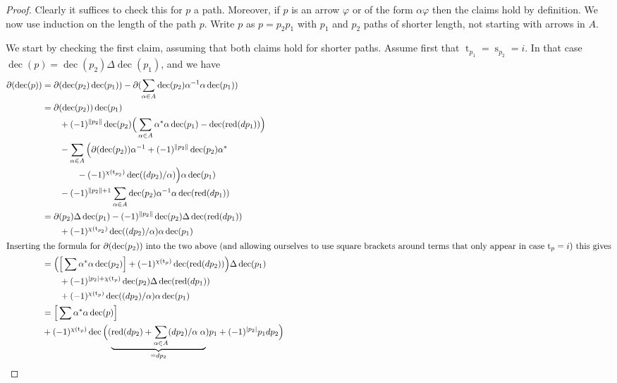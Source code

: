 \documentclass[a4paper,11pt]{amsart}
\theoremstyle{definition}
\DeclareMathOperator{\red}{red}
\DeclareMathOperator{\dec}{dec}
\newcommand{\ci}[1]{\chi(#1)}
\newcommand{\st}[1]{\operatorname{s}_{#1}}
\newcommand{\ta}[1]{\operatorname{t}_{#1}}
\numberwithin{theorem}{section}
\begin{document}
\begin{proof}
Clearly it suffices to check this for $p$ a path. Moreover, if $p$ is an arrow $\varphi$ or of the form $\alpha \varphi$ then the claims hold by definition. We now use induction on the length of the path $p$. Write $p$ as $p = p_2 p_1$ with $p_1$ and $p_2$ paths of shorter length, not starting with arrows in $A$.

We start by checking the first claim, assuming that both claims hold for shorter paths. Assume first that $\ta{p_1} = \st{p_2} =i$. In that case $\dec(p) = \dec(p_2) \Delta \dec(p_1)$, and we have
\begin{align*}
\partial(\dec(p)) & = \partial(\dec(p_2) \dec(p_1)) - \partial ( \sum_{\alpha \in A} \dec (p_2) \alpha^{-1} \alpha \dec(p_1) ) \\
& = \partial(\dec(p_2)) \dec(p_1) \\
& \qquad + (-1)^{\| p_2 \|} \dec(p_2) \Big( \sum_{\alpha \in A} \alpha^* \alpha \dec(p_1) - \dec(\red(dp_1)) \Big) \\
& \qquad - \sum_{\alpha \in A} \Big( \partial( \dec( p_2)) \alpha^{-1} + (-1)^{\|p_2\|} \dec(p_2) \alpha^* \\
& \qquad \qquad - (-1)^{\ci{\ta{p_2}}} \dec((dp_2) / \alpha) \Big) \alpha \dec(p_1) \\
& \qquad - (-1)^{\| p_2 \| + 1} \sum_{\alpha \in A} \dec(p_2) \alpha^{-1} \alpha \dec( \red( d p_1 )) \\
& = \partial(p_2) \Delta \dec( p_1) - (-1)^{\| p_2 \|} \dec(p_2) \Delta \dec( \red( d p_1)) \\
& \qquad + (-1)^{\ci{\ta{p_2}}} \dec((dp_2) / \alpha) \alpha \dec(p_1) \\
\intertext{Inserting the formula for $\partial(\dec(p_2))$ into the two above (and allowing ourselves to use square brackets around terms that only appear in case $\ta{p} = i$) this gives}
& = \Big( \Big[ \sum \alpha^* \alpha \dec(p_2) \Big] + (-1)^{\ci{ \ta{p}}} \dec(\red(dp_2)) \Big) \Delta \dec( p_1) \\
& \qquad + (-1)^{| p_2 | + \ci{ \ta{p}}} \dec(p_2) \Delta \dec( \red( d p_1)) \\
& \qquad + (-1)^{\ci{ \ta{p}}} \dec((dp_2) / \alpha) \alpha \dec(p_1) \\
& = \Big[ \sum \alpha^* \alpha \dec(p) \Big] \\
& + (-1)^{\ci{ \ta{p}}} \dec \Big( (\underbrace{\red(dp_2) + \sum_{\alpha \in A} (d p_2) / \alpha \; \alpha}_{= dp_2}) p_1 + (-1)^{|p_2|} p_1 dp_2 \Big) \\

\end{align*}
\end{proof}
\end{document}
